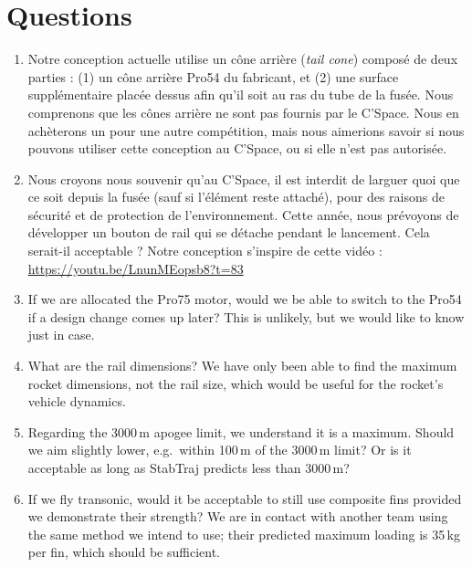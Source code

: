 \section{Questions}
\begin{enumerate}
    \item Notre conception actuelle utilise un cône arrière (\textit{tail cone}) composé de deux parties : (1) un cône arrière Pro54 du fabricant, et (2) une surface supplémentaire placée dessus afin qu'il soit au ras du tube de la fusée. Nous comprenons que les cônes arrière ne sont pas fournis par le C'Space. Nous en achèterons un pour une autre compétition, mais nous aimerions savoir si nous pouvons utiliser cette conception au C'Space, ou si elle n'est pas autorisée.

    \item Nous croyons nous souvenir qu'au C'Space, il est interdit de larguer quoi que ce soit depuis la fusée (sauf si l'élément reste attaché), pour des raisons de sécurité et de protection de l'environnement. Cette année, nous prévoyons de développer un bouton de rail qui se détache pendant le lancement. Cela serait-il acceptable ? Notre conception s'inspire de cette vidéo : \url{https://youtu.be/LnunMEopsb8?t=83}

    \item If we are allocated the Pro75 motor, would we be able to switch to the Pro54 if a design change comes up later? This is unlikely, but we would like to know just in case.

    \item What are the rail dimensions? We have only been able to find the maximum rocket dimensions, not the rail size, which would be useful for the rocket's vehicle dynamics.

    \item Regarding the 3000\,m apogee limit, we understand it is a maximum. Should we aim slightly lower, e.g.\ within 100\,m of the 3000\,m limit? Or is it acceptable as long as StabTraj predicts less than 3000\,m?

    \item If we fly transonic, would it be acceptable to still use composite fins provided we demonstrate their strength? We are in contact with another team using the same method we intend to use; their predicted maximum loading is 35\,kg per fin, which should be sufficient.
\end{enumerate}